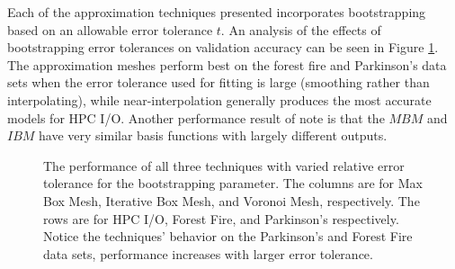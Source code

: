 \documentclass[smallextended]{svjour3}       %
\begin{document}
Each of the approximation techniques presented incorporates bootstrapping based on an allowable error tolerance $t$. An analysis of the effects of bootstrapping error tolerances on validation accuracy can be seen in Figure \ref{fig_all_performance}. The approximation meshes perform best on the forest fire and Parkinson's data sets when the error tolerance used for fitting is large (smoothing rather than interpolating), while near-interpolation generally produces the most accurate models for HPC I/O. Another performance result of note is that the $MBM$ and $IBM$ have very similar basis functions with largely different outputs.

\begin{figure}
  \caption{The performance of all three techniques with varied relative error tolerance for the bootstrapping parameter. The columns are for Max Box Mesh, Iterative Box Mesh, and Voronoi Mesh, respectively. The rows are for HPC I/O, Forest Fire, and Parkinson's respectively. Notice the techniques' behavior on the Parkinson's and Forest Fire data sets, performance increases with larger error tolerance.}
  \label{fig_all_performance}
\end{figure}
\end{document}
